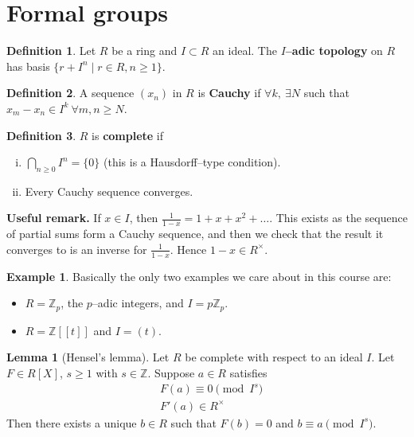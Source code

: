 \documentclass{article}
\theoremstyle{definition}
\newtheorem{lemma}[theorem]{Lemma}
\newtheorem{example}{Example}[section]
\newtheorem{defn}{Definition}[section]
\begin{document}
\section{Formal groups}
\begin{defn}
    Let $R$ be a ring and $I \subset R$ an ideal. The \textbf{$I$--adic topology} on $R$ has basis $\{r+I^n \mid r \in R, n\ge 1\}$.
\end{defn}
\begin{defn}
    A sequence $(x_n)$ in $R$ is \textbf{Cauchy} if $\forall k, ~ \exists N$ such that $x_m - x_n \in I^k ~\forall m,n \ge N$.
\end{defn}
\begin{defn}
    $R$ is \textbf{complete} if 
    \begin{enumerate}[(i)]
        \item $\bigcap_{n\ge 0} I^n = \{0\}$ (this is a Hausdorff--type condition).
        \item Every Cauchy sequence converges.
    \end{enumerate}
\end{defn}
\textbf{Useful remark.} If $x \in I$, then $\frac{1}{1-x}=1+x+x^2+\ldots$. This exists as the sequence of partial sums form a Cauchy sequence, and then we check that the result it converges to is an inverse for $\frac{1}{1-x}$. Hence $1-x \in R^{\times}$.
\begin{example}
    Basically the only two examples we care about in this course are:
    \begin{itemize}
        \item $R = \mathbb{Z}_p$, the $p$--adic integers, and $I = p \mathbb{Z}_p$.
        \item $R = \mathbb{Z}[[t]]$ and $I=(t)$.
    \end{itemize} 
\end{example} 
\begin{lemma}[Hensel's lemma]\label{lemma8.1}
    Let $R$ be complete with respect to an ideal $I$. Let $F \in R[X]$, $s\ge 1$ with $s \in \mathbb{Z}$. Suppose $a \in R$ satisfies 
    \begin{align*}
        &F(a) \equiv 0 \pmod{I^s}\\
        &F'(a) \in R^\times
    \end{align*}
    Then there exists a unique $b \in R$ such that $F(b)=0$ and $b \equiv a \pmod{I^s}$.
\end{lemma}
\end{document}
